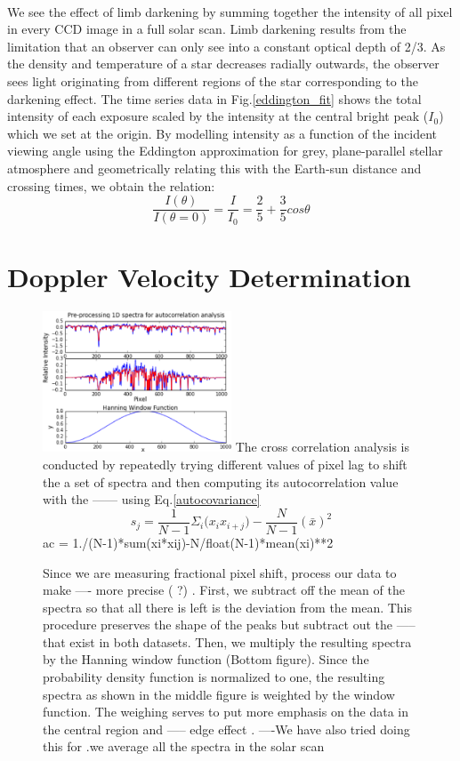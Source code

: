 \documentclass[authoryear, 12pt,5p, times]{elsarticle}
\begin{document}
\\
We see the effect of limb darkening by summing together the intensity of all pixel in every CCD image in a full solar scan. Limb darkening results from the limitation that an observer can only see into a constant optical depth of 2/3. As the density and temperature of a star decreases radially outwards, the observer sees light originating from different regions of the star corresponding to the darkening effect. The time series data in Fig.\ref{eddington_fit} shows the total intensity of each exposure scaled by the intensity at the central bright peak ($I_0$) which we set at the origin. By modelling intensity as a function of the incident viewing angle using the Eddington approximation for grey, plane-parallel stellar atmosphere and geometrically relating this with the Earth-sun distance and crossing times, we obtain the relation: 
\begin{equation}
\frac{I(\theta)}{I(\theta=0)}=\frac{I}{I_0}= \frac{2}{5}+\frac{3}{5}cos\theta
\label{eddington_eq}
\end{equation}
\section{Doppler Velocity Determination}
\begin{figure}[h!]
\includegraphics[width=0.5\textwidth]{figures/process_corr_spectra}
The cross correlation analysis is conducted by repeatedly trying different values of pixel lag to shift the a set of spectra and then computing its autocorrelation value with the ------  using Eq.\ref{autocovariance} 
\begin{equation}
s_j = \frac{1}{N-1}\Sigma_i \Bigg(x_i x_{i+j}\Bigg)-\frac{N}{N-1}(\bar{x})^2 
\label{autocovariance}
\end{equation}
    ac = 1./(N-1)*sum(xi*xij)-N/float(N-1)*mean(xi)**2
\caption{Since we are measuring fractional pixel shift, process our data to make ---- more precise ( ?) . 
First, we subtract off the mean of the spectra so that all there is left is the deviation from the mean. This procedure preserves the shape of the peaks  but subtract out the ----- that exist in both datasets. Then, we multiply the resulting spectra by the Hanning window function (Bottom figure). Since the probability density function is normalized to one, the resulting spectra as shown in the middle figure is weighted by the window function. The weighing serves to put more emphasis on the data in the central region and ----- edge effect .   ----We have also tried doing this for .we average all the spectra in the solar scan }
\label{process_corr_spectra}
\end{figure}
\end{document}
